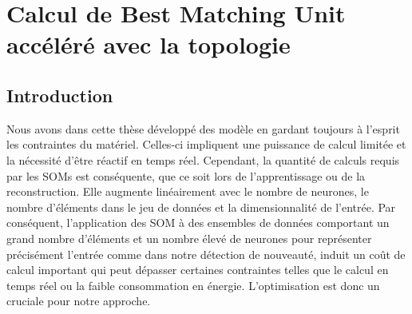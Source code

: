 
\chapter{Calcul de Best Matching Unit accéléré avec la topologie}
	\minitoc
	\newpage




	\section{Introduction}

	Nous avons dans cette thèse développé des modèle en gardant toujours à l'esprit les contraintes du matériel. Celles-ci impliquent une puissance de calcul limitée et la nécessité d'être réactif en temps réel. Cependant, la quantité de calculs requis par les SOMs est conséquente, que ce soit lors de l'apprentissage ou de la reconstruction. Elle augmente linéairement avec le nombre de neurones, le nombre d'éléments dans le jeu de données et la dimensionnalité de l'entrée. Par conséquent, l'application des SOM à des ensembles de données comportant un grand nombre d'éléments et un nombre élevé de neurones pour représenter précisément l'entrée comme dans notre détection de nouveauté, induit un coût de calcul important qui peut dépasser certaines contraintes telles que le calcul en temps réel ou la faible consommation en énergie. L'optimisation est donc un cruciale pour notre approche.


